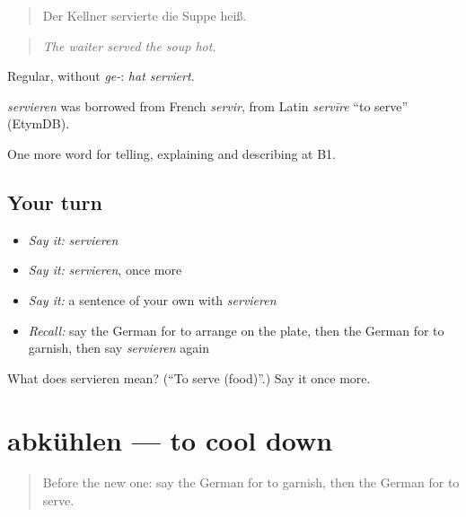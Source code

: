 \begin{quote}
Der Kellner servierte die Suppe heiß.
\end{quote}

\begin{quote}
\emph{The waiter served the soup hot.}
\end{quote}

Regular, without \emph{ge-}: \emph{hat serviert}.

\begin{cousinweb}
\emph{servieren} was borrowed from French \emph{servir}, from Latin \emph{servīre} \textquotedblleft{}to serve\textquotedblright{} (EtymDB).
\end{cousinweb}

\begin{grammarlens}[title={What you've built}]
One more word for telling, explaining and describing at B1.
\end{grammarlens}

\subsection*{Your turn}
\begin{itemize}
\raggedright
  \item \emph{Say it:} \emph{servieren}
  \item \emph{Say it:} \emph{servieren}, once more
  \item \emph{Say it:} a sentence of your own with \emph{servieren}
  \item \emph{Recall:} say the German for to arrange on the plate, then the German for to garnish, then say \emph{servieren} again
\end{itemize}

\begin{tcolorbox}[breakable,colback=teal!4,colframe=teal!35!black,title={Before you move on}]
What does servieren mean? (\textquotedblleft{}To serve (food)\textquotedblright{}.) Say it once more.
\end{tcolorbox}
\section[abkühlen]{abkühlen — to cool down}

\label{lesson:GE-C329-abkuehlen}



\begin{quote}
Before the new one: say the German for to garnish, then the German for to serve.
\end{quote}

